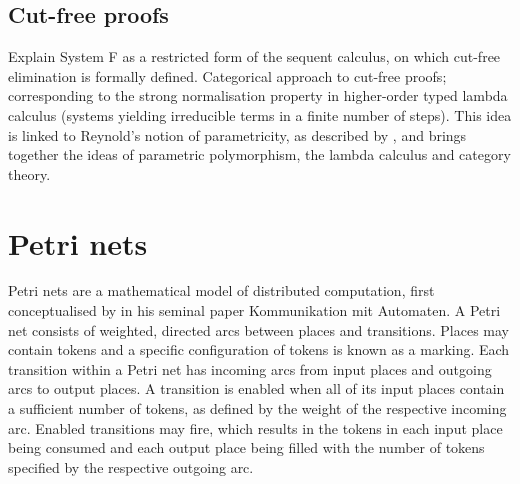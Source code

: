 \documentclass[11pt,openright,hidelinks,a4paper]{article}
\begin{document}
\subsection{Cut-free proofs}
Explain System F as a restricted form of the sequent calculus, on which cut-free elimination is formally defined.
Categorical approach to cut-free proofs; corresponding to the strong normalisation property in higher-order typed lambda calculus (systems yielding irreducible terms in a finite number of steps). This idea is linked to Reynold's notion of parametricity, as described by
, and brings together the ideas of parametric polymorphism, the lambda calculus and category theory.

\section{Petri nets}
Petri nets are a mathematical model of distributed computation, first conceptualised by   in his seminal paper Kommunikation mit Automaten. A Petri net consists of weighted, directed arcs between places and transitions. Places may contain tokens and a specific configuration of tokens is known as a marking. Each transition within a Petri net has incoming arcs from input places and outgoing arcs to output places. A transition is enabled when all of its input places contain a sufficient number of tokens, as defined by the weight of the respective incoming arc. Enabled transitions may fire, which results in the tokens in each input place being consumed and each output place being filled with the number of tokens specified by the respective outgoing arc.
\end{document}
